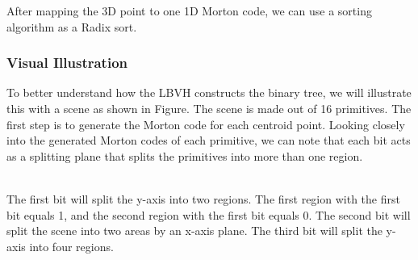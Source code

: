 \documentclass[11pt,a4paper]{article}
\begin{document}
After mapping the 3D point to one 1D Morton code, we can use a sorting algorithm as a Radix sort.

\subsubsection{Visual Illustration}
To better understand how the LBVH constructs the binary tree, we will illustrate this with a scene as shown in Figure. The scene is made out of 16 primitives. The first step is to generate the Morton code for each centroid point. Looking closely into the generated Morton codes of each primitive, we can note that each bit acts as a splitting plane that splits the primitives into more than one region. 

\noindent
\\
The first bit will split the y-axis into two regions. The first region with the first bit equals 1, and the second region with the first bit equals 0. The second bit will split the scene into two areas by an x-axis plane. The third bit will split the y-axis into four regions.
\end{document}
